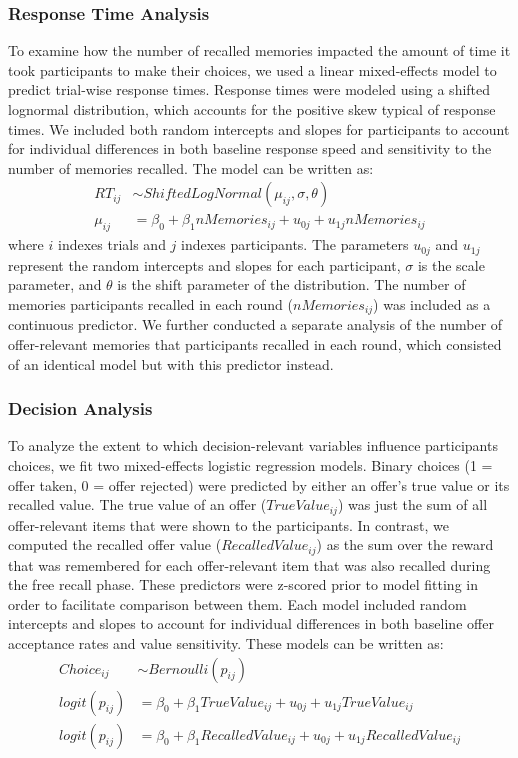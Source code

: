 \documentclass[10pt,letterpaper]{article}
\begin{document}
\subsubsection{Response Time Analysis}

To examine how the number of recalled memories impacted the amount of time it took participants to make their choices, we used a linear mixed-effects model to predict trial-wise response times. Response times were modeled using a shifted lognormal distribution, which accounts for the positive skew typical of response times. We included both random intercepts and slopes for participants to account for individual differences in both baseline response speed and sensitivity to the number of memories recalled. The model can be written as:
\begin{align*}
    RT_{ij} &\sim ShiftedLogNormal(\mu_{ij}, \sigma, \theta) \\
    \mu_{ij} &= \beta_0 + \beta_1nMemories_{ij} \nonumber + u_{0j} + u_{1j}nMemories_{ij}
\end{align*}
where $i$ indexes trials and $j$ indexes participants. The parameters $u_{0j}$ and $u_{1j}$ represent the random intercepts and slopes for each participant, $\sigma$ is the scale parameter, and $\theta$ is the shift parameter of the distribution. The number of memories participants recalled in each round ($nMemories_{ij}$) was included as a continuous predictor. We further conducted a separate analysis of the number of offer-relevant memories that participants recalled in each round, which consisted of an identical model but with this predictor instead.

\subsubsection{Decision Analysis}

To analyze the extent to which decision-relevant variables influence participants choices, we fit two  mixed-effects logistic regression models. Binary choices (1 = offer taken, 0 = offer rejected) were predicted by either an offer's true value or its recalled value. The true value of an offer ($TrueValue_{ij}$) was just the sum of all offer-relevant items that were shown to the participants. In contrast, we computed the recalled offer value ($RecalledValue_{ij}$) as the sum over the reward that was remembered for each offer-relevant item that was also recalled during the free recall phase. These predictors were z-scored prior to model fitting in order to facilitate comparison between them. Each model included random intercepts and slopes to account for individual differences in both baseline offer acceptance rates and value sensitivity. These models can be written as:
\begin{align*}
    Choice_{ij} &\sim Bernoulli(p_{ij}) \\
    logit(p_{ij}) &= \beta_0 + \beta_1TrueValue_{ij} \nonumber + u_{0j} + u_{1j}TrueValue_{ij} \\
    logit(p_{ij}) &= \beta_0 + \beta_1RecalledValue_{ij} \nonumber + u_{0j} + u_{1j}RecalledValue_{ij}
\end{align*}
\end{document}
